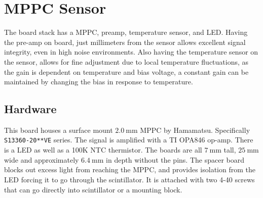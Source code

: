 \section{MPPC Sensor}

The board stack has a MPPC, preamp, temperature sensor, and LED. Having the pre-amp on board, just millimeters from the sensor allows excellent signal integrity, even in high noise environments. Also having the temperature sensor on the sensor, allows for fine adjustment due to local temperature fluctuations, as the gain is dependent on temperature and bias voltage, a constant gain can be maintained by changing the bias in response to temperature.


\subsection{Hardware}
This board houses a surface mount $\SI{2.0}{\milli\meter}$ MPPC by Hamamatsu. Specifically \texttt{S13360-20**VE} series. The signal is amplified with a TI OPA846 op-amp. There is a LED as well as a 100K NTC thermistor. The boards are all $\SI{7}{\milli\meter}$ tall, $\SI{25}{\milli\meter}$ wide and approximately $\SI{6.4}{\milli\meter}$ in depth without the pins. The spacer board blocks out excess light from reaching the MPPC, and provides isolation from the LED forcing it to go through the scintillator. It is attached with two 4-40 screws that can go directly into scintillator or a mounting block.

